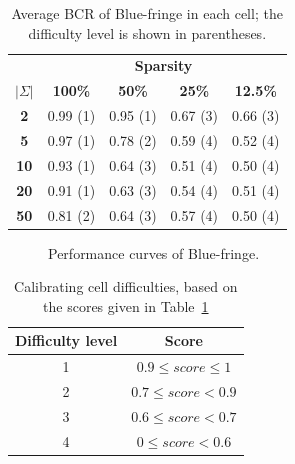 \begin{table}
\begin{center}
\begin{tabular}{c|c c c c}
&\multicolumn{4}{|c}{\textbf{Sparsity}}\\ 
\textbf{$|\Sigma|$} & \textbf{100\%} & \textbf{50\%} & \textbf{25\%} & \textbf{12.5\%}\\
\hline
\textbf{2}  & 0.99 (1) & 0.95 (1) & 0.67 (3) & 0.66 (3)\\
\textbf{5}  & 0.97 (1) & 0.78 (2) & 0.59 (4) & 0.52 (4)\\
\textbf{10} & 0.93 (1) & 0.64 (3) & 0.51 (4) & 0.50 (4)\\
\textbf{20} & 0.91 (1) & 0.63 (3) & 0.54 (4) & 0.51 (4)\\
\textbf{50} & 0.81 (2) & 0.64 (3) & 0.57 (4) & 0.50 (4)\\
\end{tabular}
\end{center}
\caption{Average BCR of Blue-fringe in each cell; the difficulty level is shown in parentheses.\label{table:stamina-baseline}}
\end{table}

\begin{figure}
\centering{}
  \caption{Performance curves of Blue-fringe\label{stamina:image:bluefringe-performance}.}
\end{figure}

\begin{table}
\begin{center}
\begin{tabular}{c|c}
Difficulty level & Score\\
\hline
1&$0.9 \leq score \leq 1$\\
2&$0.7 \leq score < 0.9$\\
3&$0.6 \leq score < 0.7$\\
4&$0 \leq score < 0.6$\\
\end{tabular}
\end{center}
\caption{\label{stamina:table:calibration}Calibrating cell difficulties, based on the scores given in Table~\ref{table:stamina-baseline}}
\end{table}

